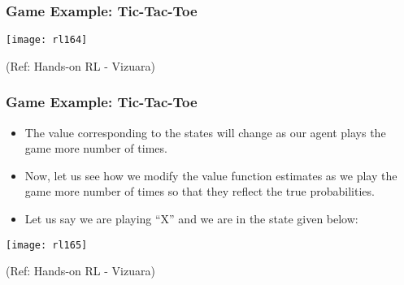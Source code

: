 \begin{frame}[fragile]\frametitle{Game Example: Tic-Tac-Toe}

\begin{center}
\texttt{[image: rl164]}

{\tiny (Ref: Hands-on RL - Vizuara)}

\end{center}

\end{frame}


\begin{frame}[fragile]\frametitle{Game Example: Tic-Tac-Toe}

\begin{itemize}
\item The value corresponding to the states will change as our agent plays the game more number of times.
\item Now, let us see how we modify the value function estimates as we play the game more number of times so that they reflect the true probabilities.
\item Let us say we are playing “X” and we are in the state given below:
\end{itemize}

\begin{center}
\texttt{[image: rl165]}

{\tiny (Ref: Hands-on RL - Vizuara)}

\end{center}

\end{frame}

